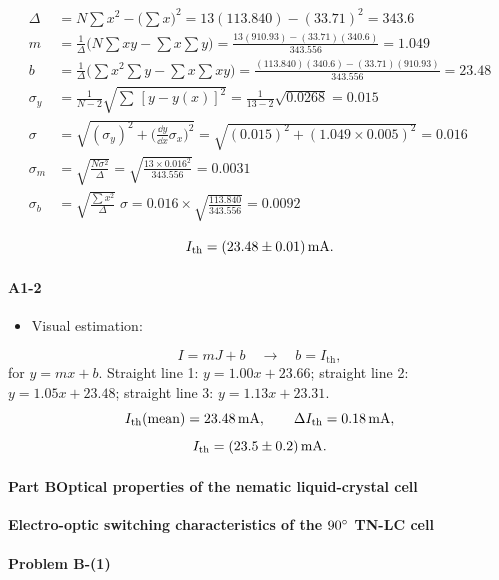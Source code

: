 \begin{align*}
\Delta&=N\sum x^{2}-\Big(\sum x\Big)^{2}=13(113.840)-(33.71)^{2}=343.6\\[2pt]
m&=\frac{1}{\Delta}\Big(N\sum xy-\sum x\sum y\Big)
 =\frac{13(910.93)-(33.71)(340.6)}{343.556}=1.049\\[2pt]
b&=\frac{1}{\Delta}\Big(\sum x^{2}\sum y-\sum x\sum xy\Big)
 =\frac{(113.840)(340.6)-(33.71)(910.93)}{343.556}=23.48\\[2pt]
\sigma_{y}&=\frac{1}{N-2}\sqrt{\sum\,[y-y(x)]^{2}}=\frac{1}{13-2}\sqrt{0.0268}=0.015\\[2pt]
\sigma&=\sqrt{(\sigma_{y})^{2}+\Big(\frac{\dd y}{\dd x}\sigma_{x}\Big)^{2}}
 =\sqrt{(0.015)^{2}+(1.049\times0.005)^{2}}=0.016\\[2pt]
\sigma_{m}&=\sqrt{\frac{N\sigma^{2}}{\Delta}}=\sqrt{\frac{13\times0.016^{2}}{343.556}}=0.0031\\[2pt]
\sigma_{b}&=\sqrt{\frac{\sum x^{2}}{\Delta}}\;\sigma=0.016\times\sqrt{\frac{113.840}{343.556}}=0.0092
\end{align*}

\[
I_{\mathrm{th}}=(23.48\pm0.01)\,\mathrm{mA}.
\]

\paragraph{A1-2}

\begin{itemize}
\item Visual estimation:
\end{itemize}

\[
I=mJ+b\quad\longrightarrow\quad b=I_{\mathrm{th}},
\]
for $y=mx+b$. Straight line 1: $y=1.00x+23.66$; straight line 2: $y=1.05x+23.48$;
straight line 3: $y=1.13x+23.31$.
\[
I_{\mathrm{th}}(\text{mean})=23.48\,\mathrm{mA},\qquad
\Delta I_{\mathrm{th}}=0.18\,\mathrm{mA},
\]
\[
I_{\mathrm{th}}=(23.5\pm0.2)\,\mathrm{mA}.
\]

\paragraph{Part B\quad Optical properties of the nematic liquid-crystal cell}

\noindent\textbf{Electro-optic switching characteristics of the $90^{\circ}$ TN-LC cell}

\paragraph{Problem B-(1)}

